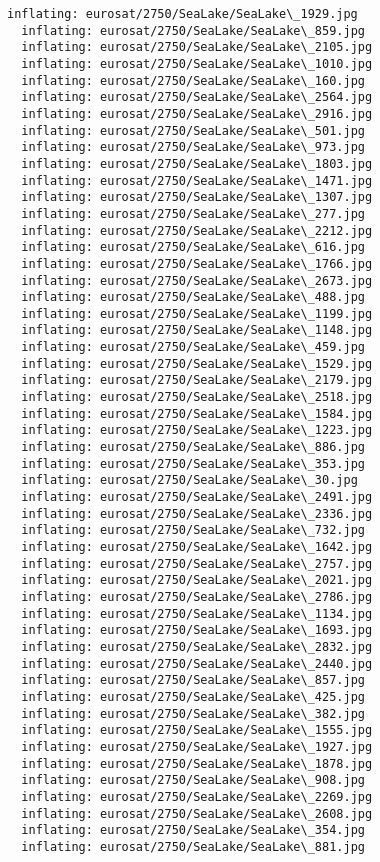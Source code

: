 \documentclass[11pt]{article}
\begin{document}
\begin{Verbatim}[commandchars=\\\{\}]
  inflating: eurosat/2750/SeaLake/SeaLake\_1929.jpg
  inflating: eurosat/2750/SeaLake/SeaLake\_859.jpg
  inflating: eurosat/2750/SeaLake/SeaLake\_2105.jpg
  inflating: eurosat/2750/SeaLake/SeaLake\_1010.jpg
  inflating: eurosat/2750/SeaLake/SeaLake\_160.jpg
  inflating: eurosat/2750/SeaLake/SeaLake\_2564.jpg
  inflating: eurosat/2750/SeaLake/SeaLake\_2916.jpg
  inflating: eurosat/2750/SeaLake/SeaLake\_501.jpg
  inflating: eurosat/2750/SeaLake/SeaLake\_973.jpg
  inflating: eurosat/2750/SeaLake/SeaLake\_1803.jpg
  inflating: eurosat/2750/SeaLake/SeaLake\_1471.jpg
  inflating: eurosat/2750/SeaLake/SeaLake\_1307.jpg
  inflating: eurosat/2750/SeaLake/SeaLake\_277.jpg
  inflating: eurosat/2750/SeaLake/SeaLake\_2212.jpg
  inflating: eurosat/2750/SeaLake/SeaLake\_616.jpg
  inflating: eurosat/2750/SeaLake/SeaLake\_1766.jpg
  inflating: eurosat/2750/SeaLake/SeaLake\_2673.jpg
  inflating: eurosat/2750/SeaLake/SeaLake\_488.jpg
  inflating: eurosat/2750/SeaLake/SeaLake\_1199.jpg
  inflating: eurosat/2750/SeaLake/SeaLake\_1148.jpg
  inflating: eurosat/2750/SeaLake/SeaLake\_459.jpg
  inflating: eurosat/2750/SeaLake/SeaLake\_1529.jpg
  inflating: eurosat/2750/SeaLake/SeaLake\_2179.jpg
  inflating: eurosat/2750/SeaLake/SeaLake\_2518.jpg
  inflating: eurosat/2750/SeaLake/SeaLake\_1584.jpg
  inflating: eurosat/2750/SeaLake/SeaLake\_1223.jpg
  inflating: eurosat/2750/SeaLake/SeaLake\_886.jpg
  inflating: eurosat/2750/SeaLake/SeaLake\_353.jpg
  inflating: eurosat/2750/SeaLake/SeaLake\_30.jpg
  inflating: eurosat/2750/SeaLake/SeaLake\_2491.jpg
  inflating: eurosat/2750/SeaLake/SeaLake\_2336.jpg
  inflating: eurosat/2750/SeaLake/SeaLake\_732.jpg
  inflating: eurosat/2750/SeaLake/SeaLake\_1642.jpg
  inflating: eurosat/2750/SeaLake/SeaLake\_2757.jpg
  inflating: eurosat/2750/SeaLake/SeaLake\_2021.jpg
  inflating: eurosat/2750/SeaLake/SeaLake\_2786.jpg
  inflating: eurosat/2750/SeaLake/SeaLake\_1134.jpg
  inflating: eurosat/2750/SeaLake/SeaLake\_1693.jpg
  inflating: eurosat/2750/SeaLake/SeaLake\_2832.jpg
  inflating: eurosat/2750/SeaLake/SeaLake\_2440.jpg
  inflating: eurosat/2750/SeaLake/SeaLake\_857.jpg
  inflating: eurosat/2750/SeaLake/SeaLake\_425.jpg
  inflating: eurosat/2750/SeaLake/SeaLake\_382.jpg
  inflating: eurosat/2750/SeaLake/SeaLake\_1555.jpg
  inflating: eurosat/2750/SeaLake/SeaLake\_1927.jpg
  inflating: eurosat/2750/SeaLake/SeaLake\_1878.jpg
  inflating: eurosat/2750/SeaLake/SeaLake\_908.jpg
  inflating: eurosat/2750/SeaLake/SeaLake\_2269.jpg
  inflating: eurosat/2750/SeaLake/SeaLake\_2608.jpg
  inflating: eurosat/2750/SeaLake/SeaLake\_354.jpg
  inflating: eurosat/2750/SeaLake/SeaLake\_881.jpg

\end{Verbatim}
\end{document}
